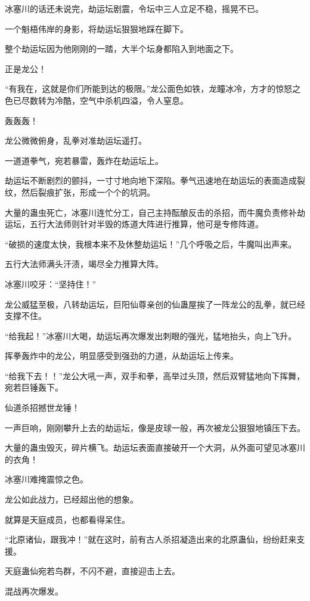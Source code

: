 \begin{this_body}
冰塞川的话还未说完，劫运坛剧震，令坛中三人立足不稳，摇晃不已。

一个魁梧伟岸的身影，将劫运坛狠狠地踩在脚下。

整个劫运坛因为他刚刚的一踏，大半个坛身都陷入到地面之下。

正是龙公！

“有我在，这就是你们所能到达的极限。”龙公面色如铁，龙瞳冰冷，方才的惊怒之色已尽数转为冷酷，空气中杀机四溢，令人窒息。

轰轰轰！

龙公微微俯身，乱拳对准劫运坛遥打。

一道道拳气，宛若暴雷，轰炸在劫运坛上。

劫运坛不断剧烈的颤抖，一寸寸地向地下深陷。拳气迅速地在劫运坛的表面造成裂纹，然后裂痕扩张，形成一个个的坑洞。

大量的蛊虫死亡，冰塞川连忙分工，自己主持酝酿反击的杀招，而牛魔负责修补劫运坛，五行大法师则针对半毁的炼道大阵进行推算，他可是专修阵道。

“破损的速度太快，我根本来不及休整劫运坛！”几个呼吸之后，牛魔叫出声来。

五行大法师满头汗渍，竭尽全力推算大阵。

冰塞川咬牙：“坚持住！”

龙公威猛至极，八转劫运坛，巨阳仙尊亲创的仙蛊屋挨了一阵龙公的乱拳，就已经支撑不住。

“给我起！”冰塞川大喝，劫运坛再次爆发出刺眼的强光，猛地抬头，向上飞升。

挥拳轰炸中的龙公，明显感受到强劲的力道，从劫运坛上传来。

“给我下去！！”龙公大吼一声，双手和拳，高举过头顶，然后双臂猛地向下挥舞，宛若巨锤轰下。

仙道杀招撼世龙锤！

一声巨响，刚刚攀升上去的劫运坛，像是皮球一般，再次被龙公狠狠地镇压下去。

大量的蛊虫毁灭，碎片横飞。劫运坛表面直接破开一个大洞，从外面可望见冰塞川的衣角！

冰塞川难掩震惊之色。

龙公如此战力，已经超出他的想象。

就算是天庭成员，也都看得呆住。

“北原诸仙，跟我冲！”就在这时，前有古人杀招凝造出来的北原蛊仙，纷纷赶来支援。

天庭蛊仙宛若鸟群，不闪不避，直接迎击上去。

混战再次爆发。


\end{this_body}
